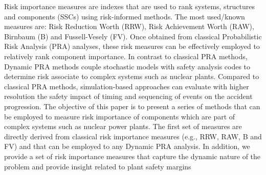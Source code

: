 Risk importance measures are indexes that are used to rank systems, 
structures and components (SSCs) using risk-informed methods. 
The most used/known measures are: Risk Reduction Worth (RRW), 
Risk Achievement Worth (RAW), Birnbaum (B) and Fussell-Vesely (FV). 
Once obtained from classical Probabilistic Risk Analysis (PRA) analyses, 
these risk measures can be effectively employed to relatively rank
component importance.
In contrast to classical PRA methods, 
Dynamic PRA methods couple stochastic models with safety analysis 
codes to determine risk associate to complex systems such as nuclear 
plants. Compared to classical PRA methods, simulation-based approaches
can evaluate with 
higher resolution the safety impact of timing and sequencing of events 
on the accident progression. 
The objective of this paper is to present a series of methods that 
can be employed to measure risk importance of components which are 
part of complex systems such as nuclear power plants.
The first set of measures are directly derived from classical risk 
importance measures (e.g., RRW, RAW, B and FV) and that can be employed
to any Dynamic PRA analysis.
In addition, we provide a set of risk importance measures that capture the 
dynamic nature of the problem and provide insight related to plant safety 
margins

